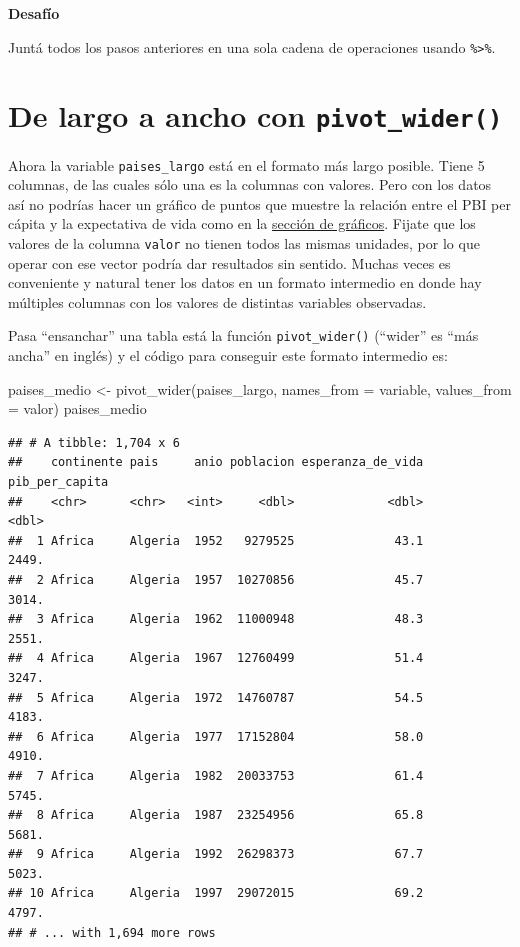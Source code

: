 \documentclass[
  openany]{book}
\newenvironment{Shaded}{\begin{snugshade}}{\end{snugshade}}
\newcommand{\AttributeTok}[1]{\textcolor[rgb]{0.77,0.63,0.00}{#1}}
\newcommand{\FunctionTok}[1]{\textcolor[rgb]{0.00,0.00,0.00}{#1}}
\newcommand{\NormalTok}[1]{#1}
\newcommand{\OtherTok}[1]{\textcolor[rgb]{0.56,0.35,0.01}{#1}}
\begin{document}
\textbf{Desafío}

Juntá todos los pasos anteriores en una sola cadena de operaciones usando \texttt{\%\textgreater{}\%}.

\hypertarget{de-largo-a-ancho-con-pivot_wider}{%
\section{\texorpdfstring{De largo a ancho con \texttt{pivot\_wider()}}{De largo a ancho con pivot\_wider()}}\label{de-largo-a-ancho-con-pivot_wider}}

Ahora la variable \texttt{paises\_largo} está en el formato más largo posible.
Tiene 5 columnas, de las cuales sólo una es la columnas con valores.
Pero con los datos así no podrías hacer un gráfico de puntos que muestre la relación entre el PBI per cápita y la expectativa de vida como en la \href{06-graficos-I.html\#Segunda_capa:_geometrías}{sección de gráficos}.
Fijate que los valores de la columna \texttt{valor} no tienen todos las mismas unidades, por lo que operar con ese vector podría dar resultados sin sentido.
Muchas veces es conveniente y natural tener los datos en un formato intermedio en donde hay múltiples columnas con los valores de distintas variables observadas.

Pasa ``ensanchar'' una tabla está la función \texttt{pivot\_wider()} (``wider'' es ``más ancha'' en inglés) y el código para conseguir este formato intermedio es:

\begin{Shaded}
\begin{Highlighting}[]
\NormalTok{paises\_medio }\OtherTok{\textless{}{-}} \FunctionTok{pivot\_wider}\NormalTok{(paises\_largo, }\AttributeTok{names\_from =}\NormalTok{ variable, }\AttributeTok{values\_from =}\NormalTok{ valor)}
\NormalTok{paises\_medio}
\end{Highlighting}
\end{Shaded}

\begin{verbatim}
## # A tibble: 1,704 x 6
##    continente pais     anio poblacion esperanza_de_vida pib_per_capita
##    <chr>      <chr>   <int>     <dbl>             <dbl>          <dbl>
##  1 Africa     Algeria  1952   9279525              43.1          2449.
##  2 Africa     Algeria  1957  10270856              45.7          3014.
##  3 Africa     Algeria  1962  11000948              48.3          2551.
##  4 Africa     Algeria  1967  12760499              51.4          3247.
##  5 Africa     Algeria  1972  14760787              54.5          4183.
##  6 Africa     Algeria  1977  17152804              58.0          4910.
##  7 Africa     Algeria  1982  20033753              61.4          5745.
##  8 Africa     Algeria  1987  23254956              65.8          5681.
##  9 Africa     Algeria  1992  26298373              67.7          5023.
## 10 Africa     Algeria  1997  29072015              69.2          4797.
## # ... with 1,694 more rows
\end{verbatim}
\end{document}
